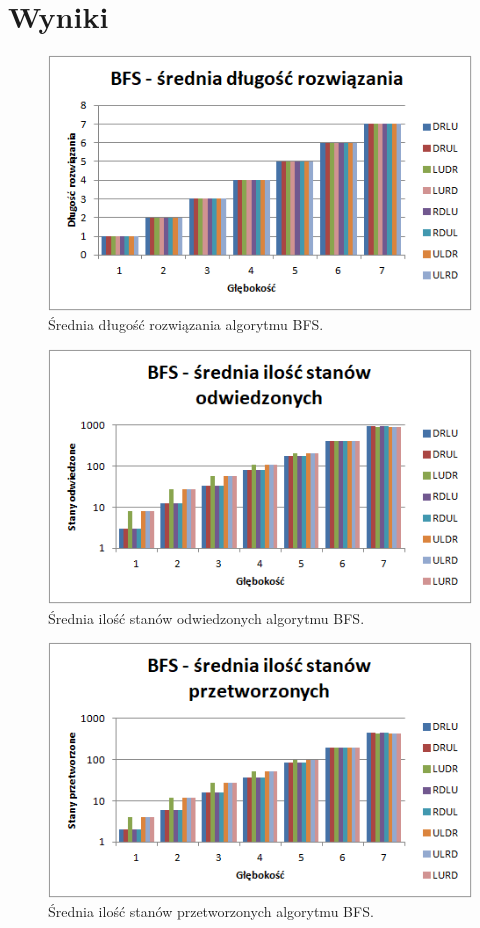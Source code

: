 \documentclass{classrep}
\begin{document}
\section{Wyniki}
\begin{figure}[H]
	\centering
		\includegraphics[width=1\textwidth]{Wykresy/1.png}
	\caption{Średnia długość rozwiązania algorytmu BFS.}
\end{figure}
\begin{figure}[H]
	\centering
		\includegraphics[width=1\textwidth]{Wykresy/2.png}
	\caption{Średnia ilość stanów odwiedzonych algorytmu BFS.}
\end{figure}
\begin{figure}[H]
	\centering
		\includegraphics[width=1\textwidth]{Wykresy/3.png}
	\caption{Średnia ilość stanów przetworzonych algorytmu BFS.}
\end{figure}
\end{document}
